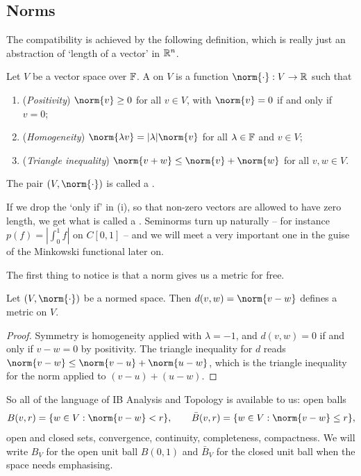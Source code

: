 \documentclass[a4paper]{scrartcl}
\begin{document}
\subsection{Norms}

The compatibility is achieved by the following definition, which is really just an abstraction of `length of a vector' in $\mathbb{R}^n$.

\begin{definition}[Norm]
	Let $V$ be a vector space over $\mathbb{F}$. A  on $V$ is a function $\norm{\cdot} : V \to \R$ such that
	\begin{enumerate}[label=(\roman*)]
		\item (\emph{Positivity}) $\norm{v} \geq 0$ for all $v \in V$, with $\norm{v} = 0$ if and only if $v = 0$;
		\item (\emph{Homogeneity}) $\norm{\lambda v} = |\lambda| \norm{v}$ for all $\lambda \in \mathbb{F}$ and $v \in V$;
		\item (\emph{Triangle inequality}) $\norm{v + w} \leq \norm{v} + \norm{w}$ for all $v, w \in V$.
	\end{enumerate}
	The pair $(V, \norm{\cdot})$ is called a .
\end{definition}

If we drop the `only if' in (i), so that non-zero vectors are allowed to have zero length, we get what is called a . Seminorms turn up naturally -- for instance $p(f) = |\int_0^1 f|$ on $C[0,1]$ -- and we will meet a very important one in the guise of the Minkowski functional later on.

The first thing to notice is that a norm gives us a metric for free.

\begin{proposition}
	Let $(V, \norm{\cdot})$ be a normed space. Then $d(v, w) = \norm{v - w}$ defines a metric on $V$.
\end{proposition}

\begin{proof}
	Symmetry is homogeneity applied with $\lambda = -1$, and $d(v,w) = 0$ if and only if $v - w = 0$ by positivity. The triangle inequality for $d$ reads $\norm{v - w} \leq \norm{v - u} + \norm{u - w}$, which is the triangle inequality for the norm applied to $(v - u) + (u - w)$.
\end{proof}

So all of the language of IB Analysis and Topology is available to us: open balls
$$B(v, r) = \{ w \in V : \norm{v - w} < r \}, \qquad \bar{B}(v,r) = \{ w \in V : \norm{v - w} \leq r \},$$
open and closed sets, convergence, continuity, completeness, compactness. We will write $B_V$ for the open unit ball $B(0,1)$ and $\bar{B}_V$ for the closed unit ball when the space needs emphasising.
\end{document}
